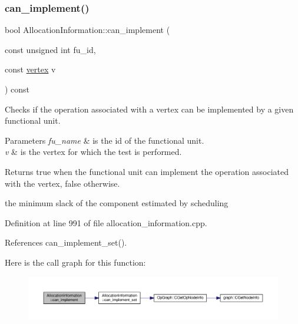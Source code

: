 \subsubsection{\texorpdfstring{can\+\_\+implement()}{can\_implement()}}
{\footnotesize\ttfamily bool Allocation\+Information\+::can\+\_\+implement (\begin{DoxyParamCaption}\item[{const unsigned int}]{fu\+\_\+id,  }\item[{const \hyperlink{graph_8hpp_abefdcf0544e601805af44eca032cca14}{vertex}}]{v }\end{DoxyParamCaption}) const}



Checks if the operation associated with a vertex can be implemented by a given functional unit. 


\begin{DoxyParams}{Parameters}
{\em fu\+\_\+name} & is the id of the functional unit. \\
\hline
{\em v} & is the vertex for which the test is performed. \\
\hline
\end{DoxyParams}
\begin{DoxyReturn}{Returns}
true when the functional unit can implement the operation associated with the vertex, false otherwise. 

the minimum slack of the component estimated by scheduling 
\end{DoxyReturn}


Definition at line 991 of file allocation\+\_\+information.\+cpp.



References can\+\_\+implement\+\_\+set().

Here is the call graph for this function\+:
\nopagebreak
\begin{figure}[H]
\begin{center}
\leavevmode
\includegraphics[width=350pt]{d7/d79/classAllocationInformation_a09aeaf5be6c6e2bcafa1b358dfa287cc_cgraph}
\end{center}
\end{figure}
\mbox{\label{classAllocationInformation_a070bb1c2f0116dd33cca59346ee57372}} 
